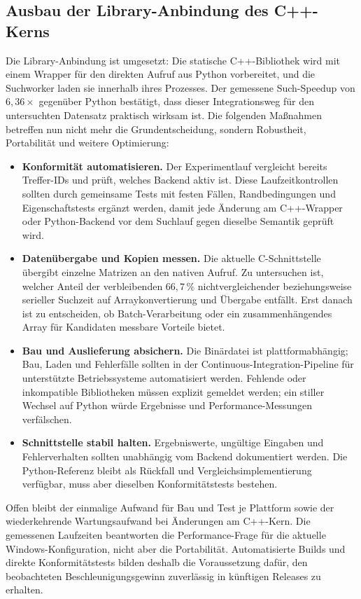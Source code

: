 \documentclass[a4paper,12pt, twoside]{report}
\theoremstyle{definition}
\begin{document}
\subsection{Ausbau der Library-Anbindung des C++-Kerns}
\label{sec:lib_anbindung}

Die Library-Anbindung ist umgesetzt: Die statische C++-Bibliothek wird mit einem Wrapper für den direkten Aufruf aus Python vorbereitet, und die Suchworker laden sie innerhalb ihres Prozesses. Der gemessene Such-Speedup von $6{,}36\times$ gegenüber Python bestätigt, dass dieser Integrationsweg für den untersuchten Datensatz praktisch wirksam ist. Die folgenden Maßnahmen betreffen nun nicht mehr die Grundentscheidung, sondern Robustheit, Portabilität und weitere Optimierung:

\begin{itemize}
	\item \textbf{Konformität automatisieren.} Der Experimentlauf vergleicht bereits Treffer-IDs und prüft, welches Backend aktiv ist. Diese Laufzeitkontrollen sollten durch gemeinsame Tests mit festen Fällen, Randbedingungen und Eigenschaftstests ergänzt werden, damit jede Änderung am C++-Wrapper oder Python-Backend vor dem Suchlauf gegen dieselbe Semantik geprüft wird.
	\item \textbf{Datenübergabe und Kopien messen.} Die aktuelle C-Schnittstelle übergibt einzelne Matrizen an den nativen Aufruf. Zu untersuchen ist, welcher Anteil der verbleibenden $66{,}7\,\%$ nichtvergleichender beziehungsweise serieller Suchzeit auf Arraykonvertierung und Übergabe entfällt. Erst danach ist zu entscheiden, ob Batch-Verarbeitung oder ein zusammenhängendes Array für Kandidaten messbare Vorteile bietet.
	\item \textbf{Bau und Auslieferung absichern.} Die Binärdatei ist plattformabhängig; Bau, Laden und Fehlerfälle sollten in der Continuous-Integration-Pipeline für unterstützte Betriebssysteme automatisiert werden. Fehlende oder inkompatible Bibliotheken müssen explizit gemeldet werden; ein stiller Wechsel auf Python würde Ergebnisse und Performance-Messungen verfälschen.
	\item \textbf{Schnittstelle stabil halten.} Ergebniswerte, ungültige Eingaben und Fehlerverhalten sollten unabhängig vom Backend dokumentiert werden. Die Python-Referenz bleibt als Rückfall und Vergleichsimplementierung verfügbar, muss aber dieselben Konformitätstests bestehen.
\end{itemize}

Offen bleibt der einmalige Aufwand für Bau und Test je Plattform sowie der wiederkehrende Wartungsaufwand bei Änderungen am C++-Kern. Die gemessenen Laufzeiten beantworten die Performance-Frage für die aktuelle Windows-Konfiguration, nicht aber die Portabilität. Automatisierte Builds und direkte Konformitätstests bilden deshalb die Voraussetzung dafür, den beobachteten Beschleunigungsgewinn zuverlässig in künftigen Releases zu erhalten.
\end{document}
